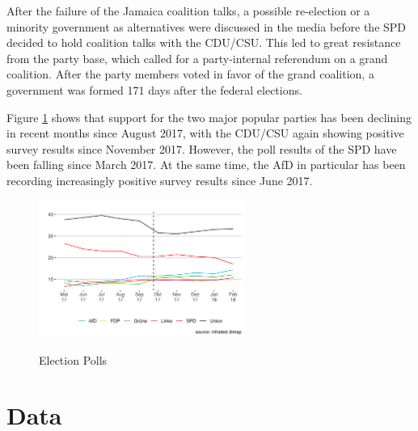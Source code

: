 \documentclass[12pt,a4paper,notitlepage]{article}
\begin{document}
After the failure of the Jamaica coalition talks, a possible re-election or a minority government as alternatives were discussed in the media before the SPD decided to hold coalition talks with the CDU/CSU. This led to great resistance from the party base, which called for a party-internal referendum on a grand coalition. After the party members voted in favor of the grand coalition, a government was formed 171 days after the federal elections. 

Figure \ref{fig_polls} shows that support for the two major popular parties has been declining in recent months since August 2017, with the CDU/CSU again showing positive survey results since November 2017. However, the poll results of the SPD have been falling since March 2017. At the same time, the AfD in particular has been recording increasingly positive survey results since June 2017.  

\begin{figure}[H]
\begin{center}
	\caption{Election Polls}
	\includegraphics[width=0.6\textwidth]{../figs/polls}
	\label{fig_polls}
	\end{center}
\end{figure}

\section{Data}\label{ch_data}


\end{document}
